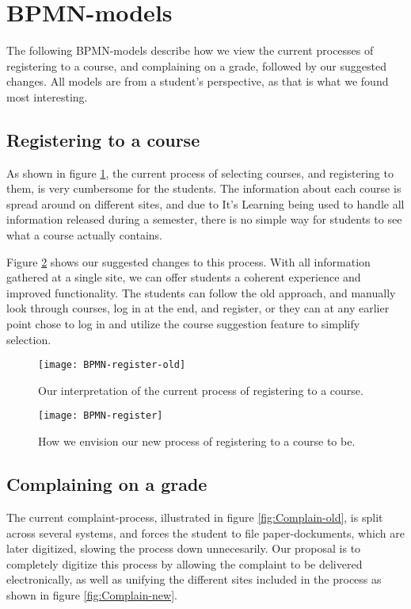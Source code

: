 \section{BPMN-models}
	The following BPMN-models\cite{bpmn} describe how we view the current processes of registering to a course, and complaining on a grade, followed by our suggested changes.
All models are from a student's perspective, as that is what we found most interesting.

\subsection{Registering to a course}
	As shown in figure \ref{fig:Register-old}, the current process of selecting courses, and registering to them, is very cumbersome for the students.
The information about each course is spread around on different sites, and due to It's Learning being used to handle all information released during a semester,
there is no simple way for students to see what a course actually contains.

Figure \ref{fig:Register-new} shows our suggested changes to this process.
With all information gathered at a single site, we can offer students a coherent experience and improved functionality.
The students can follow the old approach, and manually look through courses, log in at the end, and register,
or they can at any earlier point chose to log in and utilize the course suggestion feature to simplify selection.
\begin{figure}[H]
    \centering
    \texttt{[image: BPMN-register-old]}%
    \caption{Our interpretation of the current process of registering to a course.}
    \label{fig:Register-old}
\end{figure}

\begin{figure}[H]
    \centering
    \texttt{[image: BPMN-register]}
    \caption{How we envision our new process of registering to a course to be.}
    \label{fig:Register-new}
\end{figure}

\subsection{Complaining on a grade}
	The current complaint-process, illustrated in figure \ref{fig:Complain-old}, is split across several systems, and forces the student to file paper-dockuments,
which are later digitized, slowing the process down unnecesarily. Our proposal is to completely digitize this process  by allowing the complaint to be delivered electronically,
as well as unifying  the different sites included in the process as shown in figure \ref{fig:Complain-new}.

